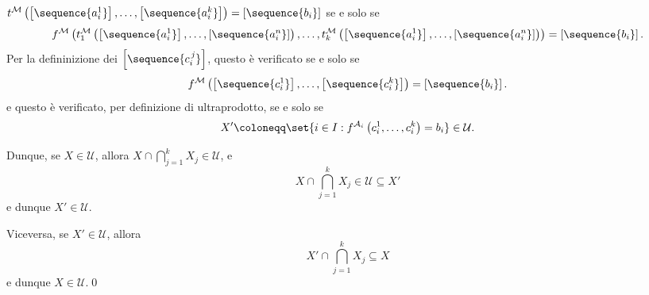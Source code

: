 {\begin{itemize}
        $t^{\mathcal{M}}\left(\left[\sequence{a_{i}^{1}}\right],\dots,\left[\sequence{a_{i}^{k}}\right]\right)=\left[\sequence{b_{i} }\right]$ se e solo se \begin{equation*}
            f^{\mathcal{M}}\left(t_1^{\mathcal{M}}\left(\left[\sequence{a^{1}_i}\right],\dots,\left[\sequence{a^{n}_i}\right]\right),\dots,t_k^{\mathcal{M}}\left(\left[\sequence{a^{1}_i}\right],\dots,\left[\sequence{a^{n}_i}\right]\right)\right) = \left[\sequence{b_{i} }\right].
        \end{equation*}Per la defininizione dei $ \left[\sequence{c_{i}^{\, j} }\right] $, questo è verificato se e solo se \begin{equation*}
            f^{\mathcal{M}}\left(
                \left[\sequence{c_{i}^{1} }\right],\dots, \left[\sequence{c_{i}^{k} }\right]
            \right) = \left[\sequence{b_{i} }\right].
        \end{equation*}e questo è verificato, per definizione di ultraprodotto, se e solo se \begin{equation*}
            X' \coloneqq \set{i \in I : f^{\mathcal{A}_i}\left(c^{1}_i,\dots,c^{k}_i\right)=b_{i} } \in \mathcal{U}.
        \end{equation*}

        Dunque, se $ X \in \mathcal{U} $, allora $ X \cap \bigcap_{j=1}^{k} X_{j} \in \mathcal{U}   $, e \begin{equation*}
            X \cap \bigcap_{j=1}^{k} X_{j} \in \mathcal{U} \subseteq X'
        \end{equation*}e dunque $ X' \in \mathcal{U} $. 

        Viceversa, se $ X' \in \mathcal{U} $, allora \begin{equation*}
            X' \cap \bigcap_{j=1}^{k} X_{j} \subseteq X  
        \end{equation*}e dunque $ X \in \mathcal{U} $.\qed


\end{itemize}}
